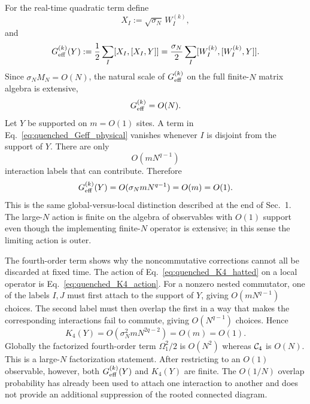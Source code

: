 \documentclass{article}
\theoremstyle{definition}
\begin{document}
For the real-time quadratic term define
\begin{equation}
    X_I:=\sqrt{\sigma_N}\,W_I^{(k)},
\end{equation}
and
\begin{equation}
    G_{\rm eff}^{(k)}(Y)
    :=\frac12\sum_I[X_I,[X_I,Y]]
    =\frac{\sigma_N}{2}\sum_I
    [W_I^{(k)},[W_I^{(k)},Y]].
    \label{eq:quenched_Geff_physical}
\end{equation}
Since $\sigma_NM_N=O(N)$, the natural scale of $G_{\rm eff}^{(k)}$ on the full finite-$N$ matrix algebra is extensive,
\begin{equation}
    G_{\rm eff}^{(k)}=O(N).
    \label{eq:quenched_Geff_global_scaling}
\end{equation}
Let $Y$ be supported on $m=O(1)$ sites. A term in Eq.~\eqref{eq:quenched_Geff_physical} vanishes whenever $I$ is disjoint from the support of $Y$. There are only
\begin{equation}
    O(mN^{q-1})
\end{equation}
interaction labels that can contribute. Therefore
\begin{equation}
    G_{\rm eff}^{(k)}(Y)
    =O(\sigma_NmN^{q-1})
    =O(m)=O(1).
    \label{eq:quenched_Geff_local_scaling}
\end{equation}
This is the same global-versus-local distinction described at the end of Sec.~1. The large-$N$ action is finite on the algebra of observables with $O(1)$ support even though the implementing finite-$N$ operator is extensive; in this sense the limiting action is outer.

The fourth-order term shows why the noncommutative corrections cannot all be discarded at fixed time. The action of Eq.~\eqref{eq:quenched_K4_hatted} on a local operator is Eq.~\eqref{eq:quenched_K4_action}. For a nonzero nested commutator, one of the labels $I,J$ must first attach to the support of $Y$, giving $O(mN^{q-1})$ choices. The second label must then overlap the first in a way that makes the corresponding interactions fail to commute, giving $O(N^{q-1})$ choices. Hence
\begin{equation}
    K_4(Y)
    =O\!\left(\sigma_N^2mN^{2q-2}\right)
    =O(m)=O(1).
    \label{eq:quenched_K4_local_scaling}
\end{equation}
Globally the factorized fourth-order term $\Omega_1^2/2$ is $O(N^2)$ whereas ${\cal C}_4$ is $O(N)$. This is a large-$N$ factorization statement. After restricting to an $O(1)$ observable, however, both $G_{\rm eff}^{(k)}(Y)$ and $K_4(Y)$ are finite. The $O(1/N)$ overlap probability has already been used to attach one interaction to another and does not provide an additional suppression of the rooted connected diagram.
\end{document}
